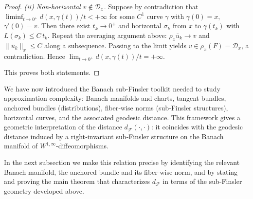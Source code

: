 \documentclass[12pt]{amsart}
\numberwithin{equation}{section}
\newtheorem{definition}{Definition}[section]
\theoremstyle{remark}
\newcommand{\ql}[1]{\texttt{\color{cyan} QL: \footnotesize #1}}
\begin{document}
\begin{proof}
\medskip\noindent
\emph{(ii) Non-horizontal $v\notin\mathcal D_x$.}
Suppose by contradiction that $\liminf_{t\to 0^+} d(x,\gamma(t))/t<+\infty$ for some $C^1$ curve $\gamma$ with $\gamma(0)=x$, $\gamma'(0)=v$.
Then there exist $t_k\to 0^+$ and horizontal $\sigma_k$ from $x$ to $\gamma(t_k)$ with $L(\sigma_k)\le C\,t_k$.
Repeat the averaging argument above: $\rho_x \bar u_k\to v$ and $\|\bar u_k\|_{x}\le C$ along a subsequence.
Passing to the limit yields $v\in \rho_x(F)=\mathcal D_x$, a contradiction.
Hence $\lim_{t\to 0^+} d(x,\gamma(t))/t=+\infty$.

\medskip
This proves both statements.
\end{proof}

We have now introduced the Banach sub‑Finsler toolkit needed to study approximation complexity: Banach manifolds and charts, tangent bundles, anchored bundles (distributions), fiber‑wise norms (sub‑Finsler structures), horizontal curves, and the associated geodesic distance. This framework gives a geometric interpretation of the distance \(d_{\mathcal F}(\cdot,\cdot)\): it coincides with the geodesic distance induced by a right‑invariant sub‑Finsler structure on the Banach manifold of \(W^{1,\infty}\)-diffeomorphisms.

In the next subsection we make this relation precise by identifying the relevant Banach manifold, the anchored bundle and its fiber‑wise norm, and by stating and proving the main theorem that characterizes \(d_{\mathcal F}\) in terms of the sub‑Finsler geometry developed above.







\end{document}
